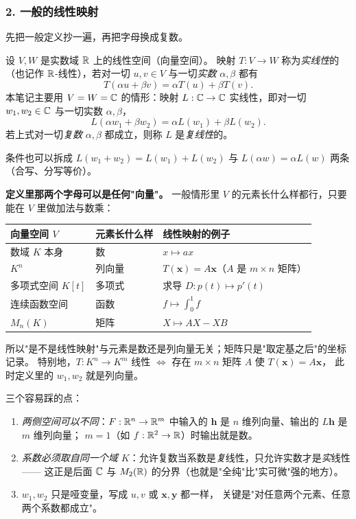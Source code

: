 \subsubsection*{2. 一般的线性映射}

先把一般定义抄一遍，再把字母换成复数。

\begin{definition}[实线性映射]
设 $V,W$ 是实数域 $\mathbb{R}$ 上的线性空间（向量空间）。
映射 $T:V\to W$ 称为\emph{实线性}的（也记作 $\mathbb{R}$-线性），若对一切 $u,v\in V$ 与一切\emph{实数} $\alpha,\beta$ 都有
\[
T(\alpha u+\beta v)=\alpha T(u)+\beta T(v).
\]
本笔记主要用 $V=W=\mathbb{C}$ 的情形：映射 $L:\mathbb{C}\to\mathbb{C}$ 实线性，即对一切 $w_1,w_2\in\mathbb{C}$ 与一切实数 $\alpha,\beta$，
\[
L(\alpha w_1+\beta w_2)=\alpha L(w_1)+\beta L(w_2).
\]
若上式对一切\emph{复数} $\alpha,\beta$ 都成立，则称 $L$ 是\emph{复线性}的。
\end{definition}

\noindent
条件也可以拆成 $L(w_1+w_2)=L(w_1)+L(w_2)$ 与 $L(\alpha w)=\alpha L(w)$ 两条（合写、分写等价）。

\smallskip
\noindent
\textbf{定义里那两个字母可以是任何"向量"。} 一般情形里 $V$ 的元素长什么样都行，只要能在 $V$ 里做加法与数乘：
\begin{center}
\renewcommand{\arraystretch}{1.3}
\begin{tabular}{|l|l|l|}
\hline
向量空间 $V$ & 元素长什么样 & 线性映射的例子\\
\hline
数域 $K$ 本身 & 数 & $x\mapsto ax$\\
\hline
$K^n$ & 列向量 & $T(\mathbf x)=A\mathbf x$（$A$ 是 $m\times n$ 矩阵）\\
\hline
多项式空间 $K[t]$ & 多项式 & 求导 $D:p(t)\mapsto p'(t)$\\
\hline
连续函数空间 & 函数 & $f\mapsto\displaystyle\int_0^1 f$\\
\hline
$M_n(K)$ & 矩阵 & $X\mapsto AX-XB$\\
\hline
\end{tabular}
\end{center}

\noindent
所以"是不是线性映射"与元素是数还是列向量无关；矩阵只是"取定基之后"的坐标记录。
特别地，$T:K^n\to K^m$ 线性 $\iff$ 存在 $m\times n$ 矩阵 $A$ 使 $T(\mathbf x)=A\mathbf x$，
此时定义里的 $w_1,w_2$ 就是列向量。

\smallskip
\noindent
三个容易踩的点：
\begin{enumerate}[label=(\arabic*), leftmargin=2.2em]
\item \emph{两侧空间可以不同}：$F:\mathbb{R}^n\to\mathbb{R}^m$ 中输入的 $\mathbf h$ 是 $n$ 维列向量、输出的 $L\mathbf h$ 是 $m$ 维列向量；
$m=1$（如 $f:\mathbb{R}^2\to\mathbb{R}$）时输出就是数。
\item \emph{系数必须取自同一个域 $K$}：允许复数当系数是\emph{复}线性，只允许实数才是\emph{实}线性——
这正是后面 $\mathbb{C}$ 与 $M_2(\mathbb{R})$ 的分界（也就是"全纯"比"实可微"强的地方）。
\item $w_1,w_2$ 只是哑变量，写成 $u,v$ 或 $\mathbf x,\mathbf y$ 都一样，
关键是"对任意两个元素、任意两个系数都成立"。
\end{enumerate}

